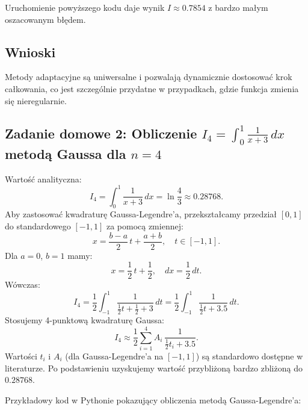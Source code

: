 \documentclass[a4paper,12pt]{article}
\begin{document}
Uruchomienie powyższego kodu daje wynik \(I \approx 0.7854\) z bardzo małym oszacowanym błędem.
\subsection*{Wnioski}
Metody adaptacyjne są uniwersalne i pozwalają dynamicznie dostosować krok całkowania, co jest szczególnie przydatne w przypadkach, gdzie funkcja zmienia się nieregularnie.

\subsection*{Zadanie domowe 2: Obliczenie \(\displaystyle I_4=\int_{0}^{1}\frac{1}{x+3}\,dx\) metodą Gaussa \cite{wiki:Kwadratury_Gaussa} dla \(n=4\)}
Wartość analityczna:
\[
I_4=\int_{0}^{1}\frac{1}{x+3}\,dx = \ln\frac{4}{3}\approx 0.28768.
\]
Aby zastosować kwadraturę Gaussa-Legendre'a, przekształcamy przedział \([0,1]\) do standardowego \([-1,1]\) za pomocą zmiennej:
\[
x = \frac{b-a}{2}\,t + \frac{a+b}{2},\quad t\in[-1,1].
\]
Dla \(a=0\), \(b=1\) mamy:
\[
x = \frac{1}{2}\,t + \frac{1}{2}, \quad dx = \frac{1}{2}\,dt.
\]
Wówczas:
\[
I_4 = \frac{1}{2}\int_{-1}^{1}\frac{1}{\frac{1}{2}t + \frac{1}{2}+3}\,dt = \frac{1}{2}\int_{-1}^{1}\frac{1}{\frac{1}{2}t+3.5}\,dt.
\]
Stosujemy 4-punktową kwadraturę Gaussa:
\[
I_4 \approx \frac{1}{2}\sum_{i=1}^{4} A_i\,\frac{1}{\frac{1}{2}t_i+3.5}.
\]
Wartości \(t_i\) i \(A_i\) (dla Gaussa-Legendre'a na \([-1,1]\)) są standardowo dostępne w literaturze. Po podstawieniu uzyskujemy wartość przybliżoną bardzo zbliżoną do \(0.28768\).

Przykładowy kod w Pythonie pokazujący obliczenia metodą Gaussa-Legendre'a:
\end{document}

